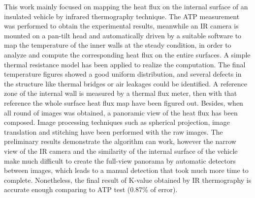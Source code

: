 \documentclass{tQRT2e}
\begin{document}
This work  mainly focused on mapping the heat flux on the internal surface of an insulated vehicle by infrared thermography technique. The ATP measurement was performed to obtain the experimental results, meanwhile an IR camera is mounted on a pan-tilt head and automatically driven by a suitable software to map the temperature of the inner walls at the steady condition, in order to analyze and compute the corresponding heat flux on the entire surfaces. A simple thermal resistance model has been applied to realize the computation. The final temperature figures showed a good uniform distribution, and several defects in the structure like thermal bridges or air leakages could be identified. A reference zone of the internal wall is measured by a thermal flux meter, then with that reference the whole surface heat flux map have been figured out. Besides, when all round of images was obtained, a panoramic view of the heat flux has been composed. Image processing techniques such as spherical projection, image translation and stitching have been performed with the raw images. The preliminary results demonstrate the algorithm can work, however the narrow view of the IR camera and the similarity of the internal surface of the vehicle make much difficult to create the full-view panorama by automatic detectors between images, which leads to a manual detection that took much more time to complete. Nonetheless, the final result of K-value obtained by IR thermography is accurate enough comparing to ATP test (0.87\% of error).



\end{document}
